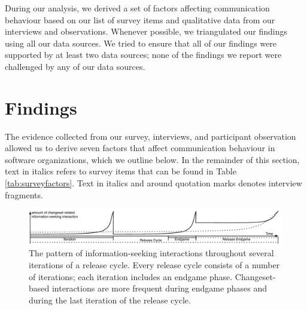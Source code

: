 \documentclass[12pt,oneside]{book}
\begin{document}
During our analysis, we derived a set of factors affecting communication behaviour based on our list of survey items and qualitative data from our interviews and observations. Whenever possible, we triangulated our findings using all our data sources. We tried to ensure that all of our findings were supported by at least two data sources; none of the findings we report were challenged by any of our data sources. 


\section{Findings}
\label{sec:findings}

The evidence collected from our survey, interviews, and participant observation allowed us to derive seven factors that affect communication behaviour in software organizations, which we outline below. In the remainder of this section, text in italics refers to survey items that can be found in Table \ref{tab:surveyfactors}. Text in italics and around quotation marks denotes interview fragments.

\begin{figure}[tb]
\centering
\includegraphics[width=\textwidth]{figures/findingProcess2}
\vspace{-20pt}\caption{The pattern of information-seeking interactions throughout several iterations of a release cycle. Every release cycle consists of a number of iterations; each iteration includes an endgame phase. Changeset-based interactions are more frequent during endgame phases and during the last iteration of the release cycle.}
\label{IterationsFig}
\end{figure}
\end{document}

